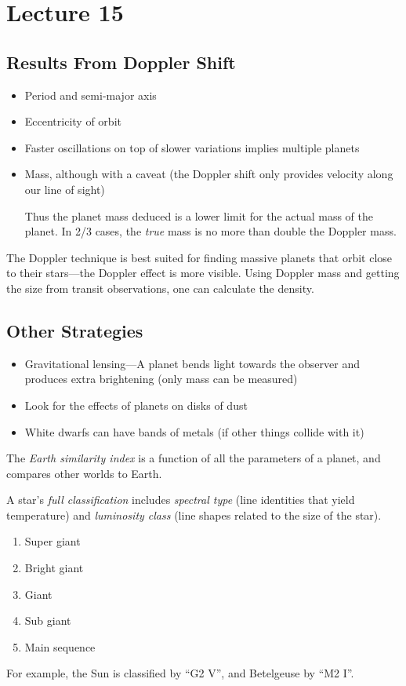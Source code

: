\documentclass[class=article, crop=false]{standalone}
\begin{document}
  \section{Lecture 15}
  \subsection{Results From Doppler Shift}
  \begin{itemize}
    \item Period and semi-major axis
    \item Eccentricity of orbit
    \item Faster oscillations on top of slower variations implies multiple planets
    \item Mass, although with a caveat (the Doppler shift only provides velocity along our line of sight)
    \begin{note}{}
      Thus the planet mass deduced is a lower limit for the actual mass of the planet. In 2/3 cases, the \emph{true} mass is no more than double the Doppler mass.
    \end{note}
  \end{itemize}
  The Doppler technique is best suited for finding massive planets that orbit close to their stars---the Doppler effect is more visible. Using Doppler mass and getting the size from transit observations, one can calculate the density.
  \subsection{Other Strategies}
  \begin{itemize}
    \item Gravitational lensing---A planet bends light towards the observer and produces extra brightening (only mass can be measured)
    \item Look for the effects of planets on disks of dust
    \item White dwarfs can have bands of metals (if other things collide with it)
  \end{itemize}
  The \emph{Earth similarity index} is a function of all the parameters of a planet, and compares other worlds to Earth. \par
  A star's \emph{full classification} includes \emph{spectral type} (line identities that yield temperature) and \emph{luminosity class} (line shapes related to the size of the star).
  \begin{enumerate}[label=(\Roman*)]
    \item Super giant
    \item Bright giant
    \item Giant
    \item Sub giant 
    \item Main sequence
  \end{enumerate}
  For example, the Sun is classified by ``G2 V'', and Betelgeuse by ``M2 I''.
\end{document}
